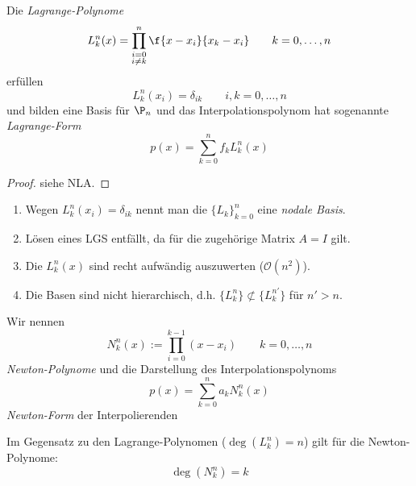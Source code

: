 \documentclass[11pt]{scrbook}
\begin{document}
\begin{st}
	\label{1.2}
	Die \emph{Lagrange-Polynome}
	\[
		L_k^n(x) = \prod_{\substack{i=0 \\ i\neq k}}^n \f {x-x_i}{x_k-x_i} \qquad k=0,\dotsc,n
	\]
	erfüllen
	\[
	L_k^n(x_i) = \delta_{ik} \qquad i,k=0,\dotsc, n
	\]
	und bilden eine Basis für $\P_n$ und das Interpolationspolynom hat sogenannte \emph{Lagrange-Form}
	\[
		p(x) = \sum_{k=0}^n f_k L_k^n(x)
	\]
	\begin{proof}
		siehe NLA.		
	\end{proof}
	\begin{note}
		\begin{enumerate}
			\item Wegen $L_k^n(x_i)=\delta_{ik}$ nennt man die $\{L_k\}_{k=0}^n$ eine \emph{nodale Basis}.
			\item Lösen eines LGS entfällt, da für die zugehörige Matrix $A=I$ gilt.
			\item Die $L_k^n(x)$ sind recht aufwändig auszuwerten ($\mathcal O(n^2)$).
			\item Die Basen sind nicht hierarchisch, d.h. $\{L_k^n\} \not\subset \{L_k^{n'}\}$ für $n'> n$.
		\end{enumerate}
	\end{note}
\end{st}

\begin{df}
	\label{1.3}
	Wir nennen
	\[
		N_k^n(x) := \prod_{i=0}^{k-1}(x-x_i) \qquad k=0,\dotsc,n
	\]
	\emph{Newton-Polynome} und die Darstellung des Interpolationspolynoms
	\[
		p(x) = \sum_{k=0}^n a_k N_k^n(x)
	\]
	\emph{Newton-Form} der Interpolierenden
\end{df}

\begin{note*}
	Im Gegensatz zu den Lagrange-Polynomen ($\deg(L_k^n) = n$) gilt für die Newton-Polynome:
	\[
		\deg(N_k^n) = k
	\]
\end{note*}
\end{document}
